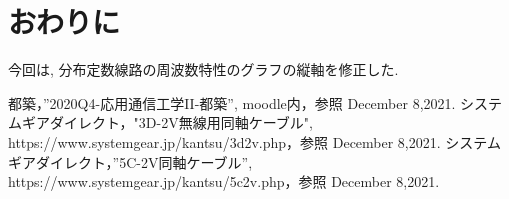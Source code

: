\documentclass[a4j,12pt,]{jarticle}
\begin{document}
\section{おわりに}

今回は, 分布定数線路の周波数特性のグラフの縦軸を修正した.

\begin{thebibliography}{5}
  都築，”2020Q4-応用通信工学II-都築”, moodle内，参照 December 8,2021.
  システムギアダイレクト，"3D-2V無線用同軸ケーブル", https://www.systemgear.jp/kantsu/3d2v.php，参照 December 8,2021.
  システムギアダイレクト，”5C-2V同軸ケーブル”, https://www.systemgear.jp/kantsu/5c2v.php，参照 December 8,2021.
\end{thebibliography}
\end{document}
